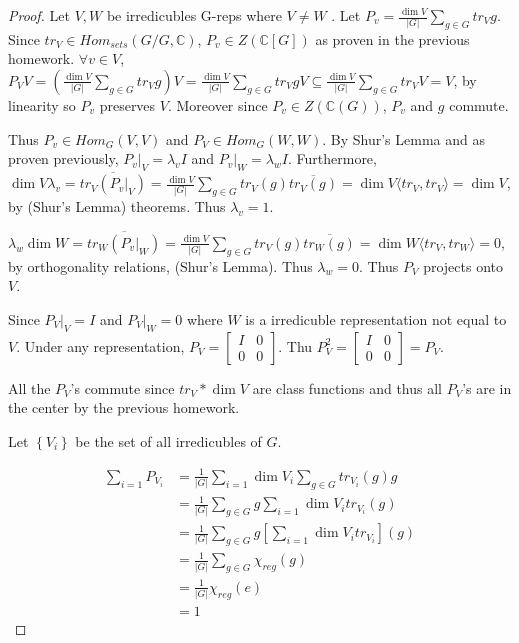 \documentclass{article}
\newcommand{\C}{\mathbb{C}}
\newcommand{\angles}[1]{\langle #1 \rangle}
\begin{document}
\begin{proof}
    Let $V, W$ be irredicubles G-reps where $V \neq W$ . Let $P_v = \frac{\dim V}{|G|} \sum_{g \in G} tr_V g$. Since $tr_V \in Hom_{sets}(G / G, \C)$, $P_v \in Z(\C[G])$ as proven in the previous homework. $\forall v \in V$, $P_V V = (\frac{\dim V}{|G|} \sum_{g \in G} tr_V g)V = \frac{\dim V}{|G|} \sum_{g \in G} tr_V gV \subseteq \frac{\dim V}{|G|} \sum_{g \in G} tr_V V = V$, by linearity so $P_v$ preserves $V$. Moreover since $P_v \in Z(\C(G))$, $P_v$ and $g$ commute. 
    
    Thus $P_v \in Hom_G(V, V)$ and $P_V \in Hom_G(W, W)$. By Shur's Lemma and as proven previously, $P_v|_V = \lambda_v I$ and $P_v|_W = \lambda_w I$. Furthermore, $\dim V \lambda_v = \overline{tr_V(P_v|_V)} = \frac{\dim V}{|G|} \sum_{g \in G} tr_V(g) \overline{tr_V(g)} = \dim V \angles{tr_V, tr_V} = \dim V$, by (Shur's Lemma) theorems. Thus $\lambda_v = 1$.
    
    $\lambda_w \dim W = \overline{tr_W(P_v|_W)} = \frac{\dim V}{|G|} \sum_{g \in G} tr_V(g) \overline{tr_W(g)} = \dim W \angles{tr_V, tr_W} = 0$, by orthogonality relations, (Shur's Lemma). Thus $\lambda_w = 0$. Thus $P_V$ projects onto $V$. 
    
    Since $P_V|_V = I$ and $P_V|_W = 0$ where $W$ is a irredicuble representation not equal to $V$. Under any representation, $P_V = \begin{bmatrix}
        I & 0 \\ 0 & 0
    \end{bmatrix}$. Thu $P_V^2 = \begin{bmatrix}
        I & 0 \\ 0 & 0
    \end{bmatrix} = P_V$. 
    
    All the $P_V$'s commute since $tr_V * \dim V$ are class functions and thus all $P_V$'s are in the center by the previous homework.


    Let $\left\{ V_i \right\}$ be the set of all irredicubles of $G$. 
    
    \begin{align*}
        \sum_{i = 1} P_{V_i} &= \frac{1}{|G|} \sum_{i = 1} \dim V_i \sum_{g \in G} tr_{V_i}(g) g \\
        &= \frac{1}{|G|} \sum_{g \in G} g \sum_{i = 1} \dim V_i tr_{V_i}(g) \\
        &=\frac{1}{|G|}\sum_{g \in G} g [\sum_{i = 1} \dim V_i tr_{V_i}](g) \\
        &= \frac{1}{|G|}\sum_{g \in G} \chi_{reg}(g) \\
        &= \frac{1}{|G|} \chi_{reg}(e) \\
        &= 1
    \end{align*}
 

\end{proof}
\end{document}
